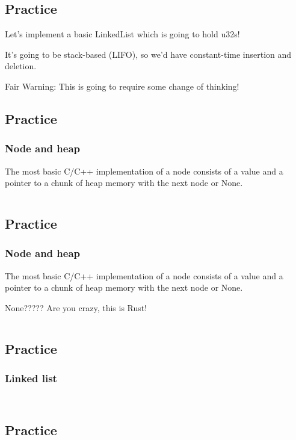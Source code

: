 \documentclass[usenames,twocolumn,dvipsnames,10pt,a4wide]{article}
\begin{document}
\subsection{Practice}
Let's implement a basic LinkedList which is going to
hold u32s!


It's going to be stack-based (LIFO), so we'd have
constant-time insertion and deletion.


Fair Warning: This is going to require some change of thinking!


\subsection{Practice}
\subsubsection{Node and heap}
The most basic C/C++ implementation of a node
consists of a value and a pointer to a chunk of
heap memory with the next node or None.

\inputminted[fontsize=\normalsize]{rust}{code/list1.rs}


\subsection{Practice}
\subsubsection{Node and heap}
The most basic C/C++ implementation of a node
consists of a value and a pointer to a chunk of
heap memory with the next node or None.

None????? Are you crazy, this is Rust!

\inputminted[fontsize=\normalsize]{rust}{code/list2.rs}


\subsection{Practice}
\subsubsection{Linked list}
\inputminted[fontsize=\normalsize]{rust}{code/list3.rs}

\inputminted[fontsize=\normalsize]{rust}{code/list4.rs}



\subsection{Practice}
\end{document}
